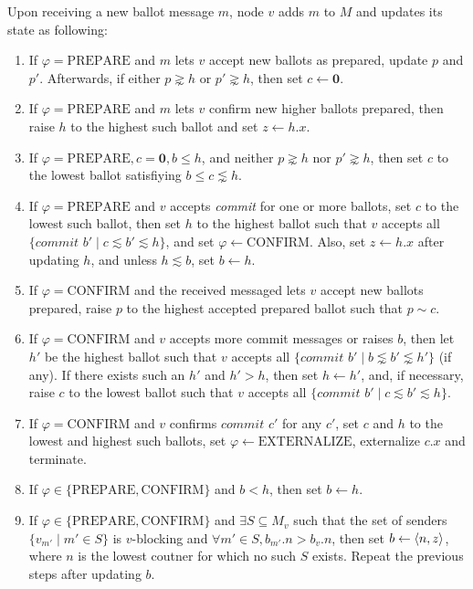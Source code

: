 \begin{defn}
    Upon receiving a new ballot message $m$, node $v$ adds $m$ to $M$ and updates its state as following:
    \begin{enumerate}
        \item %
            If $\varphi = \text{PREPARE}$ and $m$ lets $v$ accept new ballots as prepared, update $p$ and $p'$.
            Afterwards, if either $p \gnsim h$ or $p' \gnsim h$, then set $c \leftarrow \textbf{0}$.
        \item %
            If $\varphi = \text{PREPARE}$ and $m$ lets $v$ confirm new higher ballots prepared, then raise $h$ to the highest such ballot and set $z \leftarrow h.x$.
        \item %
            If $\varphi = \text{PREPARE}, c = \textbf{0}, b \leq h$, and neither $p \gnsim h$ nor $p' \gnsim h$, then set $c$ to the lowest ballot satisfiying $b \leq c \lnsim h$.
        \item %
            If $\varphi = \text{PREPARE}$ and $v$ accepts \textit{commit} for one or more ballots, set $c$ to the lowest such ballot, then set $h$ to the highest ballot such that $v$ accepts all $\{ \textit{commit } b' \mid c \lesssim b' \lesssim h \}$, and set $\varphi \leftarrow \text{CONFIRM}$.
            Also, set $z \leftarrow h.x$ after updating $h$, and unless $h \lesssim b$, set $b \leftarrow h$.
        \item %
            If $\varphi = \text{CONFIRM}$ and the received messaged lets $v$ accept new ballots prepared, raise $p$ to the highest accepted prepared ballot such that $p \sim c$.
        \item %
            If $\varphi = \text{CONFIRM}$ and $v$ accepts more commit messages or raises $b$, then let $h'$ be the highest ballot such that $v$ accepts all $\{ \textit{commit } b' \mid b \lnsim b' \lnsim h' \}$  (if any).
            If there exists such an $h'$ and $h' > h$, then set $h \leftarrow h'$, and, if necessary, raise $c$ to the lowest ballot such that $v$ accepts all $\{ \textit{commit } b' \mid c \lesssim b' \lesssim h \}$.
        \item %
            If $\varphi = \text{CONFIRM}$ and $v$ confirms $\textit{commit } c'$ for any $c'$, set $c$ and $h$ to the lowest and highest such ballots, set $\varphi \leftarrow \text{EXTERNALIZE}$, externalize $c.x$ and terminate.
        \item %
            If $\varphi \in \{ \text{PREPARE}, \text{CONFIRM} \}$ and $b < h$, then set $b \leftarrow h$.
        \item %
            If $\varphi \in \{ \text{PREPARE}, \text{CONFIRM} \}$ and $\exists S \subseteq M_v$ such that the set of senders $\{ v_{m'} \mid m' \in S \}$ is $v$-blocking and $\forall m' \in S, b_{m'}.n > b_v.n$, then set $b \leftarrow \ev{n, z}$, where $n$ is the lowest coutner for which no such $S$ exists.
            Repeat the previous steps after updating $b$.
    \end{enumerate}
\end{defn}


